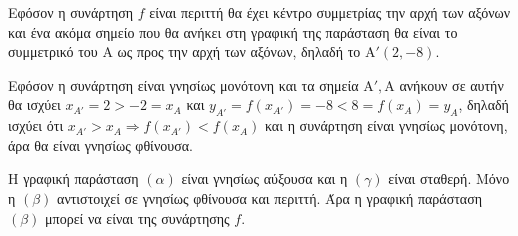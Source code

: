 \begin{alist}
\item Εφόσον η συνάρτηση $f$ είναι περιττή θα έχει κέντρο συμμετρίας την αρχή των αξόνων και ένα ακόμα σημείο που θα ανήκει στη γραφική της παράσταση θα είναι το συμμετρικό του $\text{A}$ ως προς την αρχή των αξόνων, δηλαδή το $\text{A}'(2, -8)$.
\item Εφόσον η συνάρτηση είναι γνησίως μονότονη και τα σημεία $\text{A}', \text{A}$ ανήκουν σε αυτήν θα ισχύει $x_{A'} = 2 > -2 = x_A$ και $y_{A'} = f(x_{A'}) = -8 < 8 = f(x_A) = y_A$, δηλαδή ισχύει ότι $x_{A'} > x_A \Rightarrow f(x_{A'}) < f(x_A)$ και η συνάρτηση είναι γνησίως μονότονη, άρα θα είναι γνησίως φθίνουσα.
\item Η γραφική παράσταση $(\alpha)$ είναι γνησίως αύξουσα και η $(\gamma)$ είναι σταθερή. Μόνο η $(\beta)$ αντιστοιχεί σε γνησίως φθίνουσα και περιττή. Άρα η γραφική παράσταση $(\beta)$ μπορεί να είναι της συνάρτησης $f$.
\end{alist}

